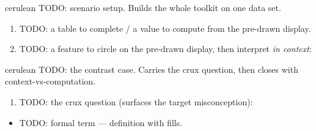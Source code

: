 \vspace{0.04in}

\begin{scenariobox}{cerulean}
TODO: scenario setup. Builds the whole toolkit on one data set.
\begin{enumerate}[label=\textbf{\alph*.}, leftmargin=1.8em, itemsep=8pt]
  \item TODO: a table to complete / a value to compute from the pre-drawn display.
  \item TODO: a feature to circle on the pre-drawn display, then interpret \emph{in context}:
\end{enumerate}
\end{scenariobox}

\boxguard[16]
\begin{scenariobox}{cerulean}
TODO: the contrast case. Carries the crux question, then closes with context-vs-computation.
\begin{enumerate}[label=\textbf{\alph*.}, leftmargin=1.8em, itemsep=8pt]
  \item TODO: the crux question (surfaces the target misconception):
\end{enumerate}
\end{scenariobox}

\boxguard[14]
\begin{tcolorbox}[enhanced, colback=frost, colframe=cerulean, boxrule=0.8pt, arc=2mm,
    left=3mm, right=3mm, top=1.5mm, bottom=1.5mm, breakable,
    fonttitle=\bfseries\small\color{white}, title={QuickNotes: TODO Topic},
    attach boxed title to top left={yshift=-2mm, xshift=4mm},
    boxed title style={colback=cerulean, colframe=cerulean, arc=1.5mm}]
\small
\begin{itemize}[leftmargin=1.1em, itemsep=8pt]
  \item TODO: formal term --- definition with  fills.
\end{itemize}
\end{tcolorbox}

